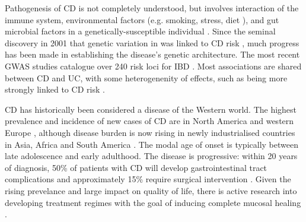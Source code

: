 Pathogenesis of \gls{CD} is not completely understood, but involves interaction of the immune system, environmental factors (e.g. smoking, stress, diet \autocite{ananthakrishnan2015EpidemiologyRiskFactors,roda2020CrohnDisease}), and gut microbial factors in a genetically-susceptible individual \autocite{desouza2016ImmunopathogenesisIBDCurrent}.
Since the seminal discovery in 2001 that genetic variation in  was linked to \gls{CD} risk \autocite{todd2001TacklingCommonDisease},
much progress has been made in establishing the disease's genetic architecture.
The most recent \gls{GWAS} studies catalogue over 240 risk loci for \gls{IBD} \autocite{delange2017GenomewideAssociationStudy}.
Most associations are shared between \gls{CD} and \gls{UC}, with some heterogenenity of effects, such as  being more strongly linked to \gls{CD} risk \autocite{jostins2012HostMicrobeInteractions,liu2015AssociationAnalysesIdentify}.

\gls{CD} has historically been considered a disease of the Western world.
The highest prevalence and incidence of new cases of \gls{CD} are in North America and western Europe \autocite{roda2020CrohnDisease},
although disease burden is now rising in newly industrialised countries in Asia, Africa and South America \autocite{kaplan2015GlobalBurdenIBD,alatab2020GlobalRegionalNational}.
The modal age of onset is typically between late adolescence and early adulthood.
The disease is progressive: within 20 years of diagnosis, 50\% of patients with CD will develop gastrointestinal tract complications and approximately 15\% require surgical intervention \autocite{roda2020CrohnDisease}.
Given the rising prevelance and large impact on quality of life, there is active research into developing treatment regimes with the goal of inducing complete mucosal healing \autocite{levin2016MechanismActionAntiTNF,roda2020CrohnDisease}.

